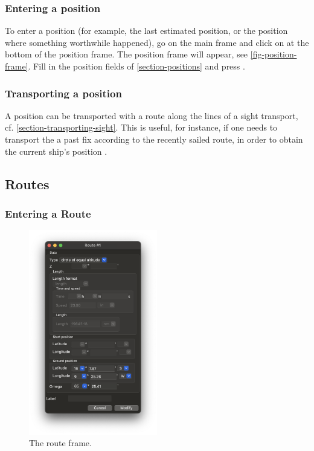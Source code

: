 \documentclass{ol-softwaremanual}
\begin{document}
\subsubsection{Entering a position}\label{section-enter-position}

To enter a position  (for example, the last estimated position, or the position where something worthwhile happened), go on the main frame and click on  at the bottom of the position frame. The position frame will appear, see \cref{fig-position-frame}. Fill in the position fields of \cref{section-positions} and press . 

\subsubsection{Transporting a position}\label{section-transport-position}

A position can be transported with a route along the lines of a sight transport, cf. \cref{section-transporting-sight}. This is useful, for instance, if one needs to transport the a past fix according to the recently sailed route, in order to obtain the current ship's position \cite{bowditch2002the}. 


\subsection{Routes}\label{section-routes}

\subsubsection{Entering a Route}\label{section-entering-route}

\begin{figure}
  \includegraphics[width=0.5\textwidth]{figures/route-frame.png}
  \caption{
    \label{fig-route-frame}
    The route frame.  
  }
\end{figure}
\end{document}
